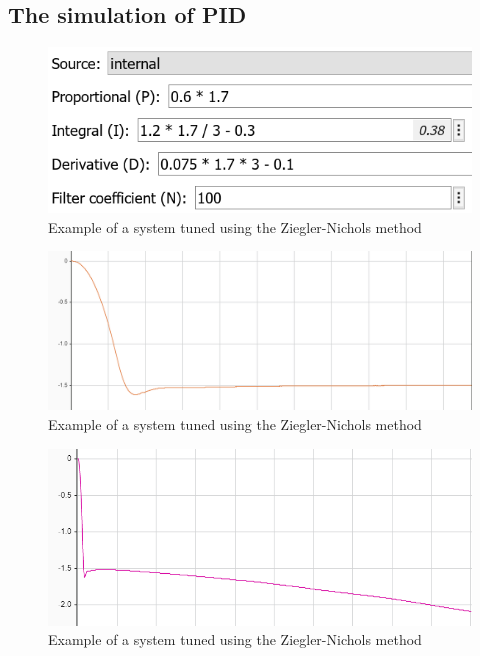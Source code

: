 \subsection{The simulation of PID}

\begin{figure}[H]
    \begin{center}
    \includegraphics[scale=0.7]{pictures/control/simpidvalues}
    \end{center}
    \caption{Example of a system tuned using the Ziegler-Nichols method\cite{LibrePID}}
    \label{fig:simpidvalues}
\end{figure}

\begin{figure}[H]
    \begin{center}
    \includegraphics[scale=0.7]{pictures/control/zpidnonoise}
    \end{center}
    \caption{Example of a system tuned using the Ziegler-Nichols method\cite{LibrePID}}
    \label{fig:zpidnonoise}
\end{figure}

\begin{figure}[H]
    \begin{center}
    \includegraphics[scale=1]{pictures/control/zpidnoise}
    \end{center}
    \caption{Example of a system tuned using the Ziegler-Nichols method\cite{LibrePID}}
    \label{fig:zpidnoise}
\end{figure}
